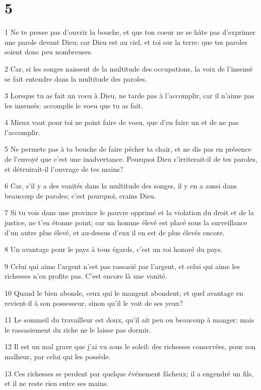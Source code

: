 \chapter{5}

\par 1 Ne te presse pas d'ouvrir la bouche, et que ton coeur ne se hâte pas d'exprimer une parole devant Dieu; car Dieu est au ciel, et toi sur la terre: que tes paroles soient donc peu nombreuses.
\par 2 Car, si les songes naissent de la multitude des occupations, la voix de l'insensé se fait entendre dans la multitude des paroles.
\par 3 Lorsque tu as fait un voeu à Dieu, ne tarde pas à l'accomplir, car il n'aime pas les insensés: accomplis le voeu que tu as fait.
\par 4 Mieux vaut pour toi ne point faire de voeu, que d'en faire un et de ne pas l'accomplir.
\par 5 Ne permets pas à ta bouche de faire pécher ta chair, et ne dis pas en présence de l'envoyé que c'est une inadvertance. Pourquoi Dieu s'irriterait-il de tes paroles, et détruirait-il l'ouvrage de tes mains?
\par 6 Car, s'il y a des vanités dans la multitude des songes, il y en a aussi dans beaucoup de paroles; c'est pourquoi, crains Dieu.
\par 7 Si tu vois dans une province le pauvre opprimé et la violation du droit et de la justice, ne t'en étonne point; car un homme élevé est placé sous la surveillance d'un autre plus élevé, et au-dessus d'eux il en est de plus élevés encore.
\par 8 Un avantage pour le pays à tous égards, c'est un roi honoré du pays.
\par 9 Celui qui aime l'argent n'est pas rassasié par l'argent, et celui qui aime les richesses n'en profite pas. C'est encore là une vanité.
\par 10 Quand le bien abonde, ceux qui le mangent abondent; et quel avantage en revient-il à son possesseur, sinon qu'il le voit de ses yeux?
\par 11 Le sommeil du travailleur est doux, qu'il ait peu ou beaucoup à manger; mais le rassasiement du riche ne le laisse pas dormir.
\par 12 Il est un mal grave que j'ai vu sous le soleil: des richesses conservées, pour son malheur, par celui qui les possède.
\par 13 Ces richesses se perdent par quelque événement fâcheux; il a engendré un fils, et il ne reste rien entre ses mains.
